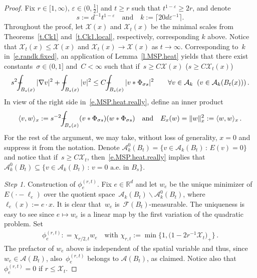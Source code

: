 \documentclass[11pt]{article} %
\numberwithin{equation}{section}
\theoremstyle{definition}
\newcommand*{\R}{\ensuremath{\mathbb{R}}}
\newcommand{\eps}{\varepsilon}
\newcommand{\qand}{\quad \mbox{and} \quad }
\newcommand{\ep}{\eps}
\newcommand{\F}{\mathcal{F}}
\newcommand{\X}{\mathcal{X}}
\newcommand{\minscale}{\chi}
\def\Xint#1{\mathchoice
{\XXint\displaystyle\textstyle{#1}}%
{\XXint\textstyle\scriptstyle{#1}}%
{\XXint\scriptstyle\scriptscriptstyle{#1}}%
{\XXint\scriptscriptstyle\scriptscriptstyle{#1}}%
\!\int}
\def\XXint#1#2#3{{\setbox0=\hbox{$#1{#2#3}{\int}$}
\vcenter{\hbox{$#2#3$}}\kern-.5\wd0}}
\def\fint{\Xint-}
\newcommand{\A}{\mathcal{A}}
\begin{document}
\begin{proof}
Fix $r \in [1,\infty)$, $\ep \in (0,\frac12]$ and $t \geq r$ such that $t^{1-\ep} \geq 2r$, and denote
\begin{equation}  \label{e.randk.fixed}
s :=d^{-1}  t^{1-\ep}
\qand
k := \lceil 20d \ep^{-1}  \rceil.
\end{equation}
Throughout the proof, let $\X(x)$ and $\X_t(x)$ be the minimal scales from Theorems~\ref{t.Ck1} and~\ref{t.Ck1.local},  respectively, corresponding $k$ above. Notice that $\X_t(x) \leq \X(x)$ and $\X_t(x) \to \X(x)$ as $t \to \infty$. Corresponding to~$k$ in~\eqref{e.randk.fixed}, an application of Lemma~\ref{l.MSP.heat} yields that there exist constants~$\sigma \in (0,1]$ and~$C<\infty$ such that if~$s \geq C\X(x)$ ($s \geq C\X_t(x)$)
\begin{align} \label{e.MSP.heat.really}
s^2 \fint_{B_{s}(x) } | \nabla  v|^2 + \fint_{B_{s}(x) } | v|^2 
\leq 
C \fint_{ B_{s}(x)} | v \ast \Phi_{\sigma s}|^2 
\qquad \forall v \in \A_k  \; \; (v \in \A_k(B_t(x)) ) 
\, .
\end{align}
In view of the right side in~\eqref{e.MSP.heat.really}, define an inner product
\begin{align}  \label{e.innerproduct}
\langle v,w\rangle_x
:= 
s^{-2}
\fint_{ B_{s}(x) } (v \ast \Phi_{\sigma s}) (w \ast \Phi_{\sigma s})
\qand
E_x(w) = \| w\|_x^2 := \langle w,w\rangle_x
\,. 
\end{align}
For the rest of the argument, we may take, without loss of generality, $x=0$ and suppress it from the notation. Denote 
$\A_k^{0}(B_t) = \{ v \in \A_k(B_t) \, : \, E(v) = 0 \}$ and notice that if~$s \geq C\X_t$, then~\eqref{e.MSP.heat.really} implies that 
$\A_k^{0}(B_t) \subseteq \{ v \in \A_k(B_t) \, : \, v = 0 \mbox{ a.e. in } B_s \}$. 

\smallskip

\emph{Step 1.} Construction of $\phi_e^{(r,t)}$.  
Fix $e \in \R^d$ and let $w_e$ be the unique minimizer of $E(\cdot-\ell_e)$ over the quotient space~$\A_{k}(B_t) \backslash \A_k^{0}(B_t)$, where~$\ell_e(x) := e \cdot x$. It is clear that~$w_e$ is~$\F(B_t)$-measurable. The uniqueness is easy to see since $e \mapsto w_e$ is a linear map by the first variation of the quadratic problem. 
Set 
\begin{align}  \label{e.localcorrdef}
\phi_{e}^{(r,t)}  : = \minscale_{r/2, t} w_e  
\quad \mbox{with } 
\minscale_{r, t} := \min\big\{1, \bigl(1 -   2 r^{-1} \X_t \bigr)_+ \big\} 
\,.
\end{align}
The prefactor of $w_e$ above is independent of the spatial variable and thus, since~$w_e \in \A(B_t)$, also~$\phi_{e}^{(r,t)}$ belongs to $\A(B_t)$, as claimed.  Notice also that~$\phi_{e}^{(r,t)}=0$ if $r \leq \X_t$. 


\end{proof}
\end{document}
